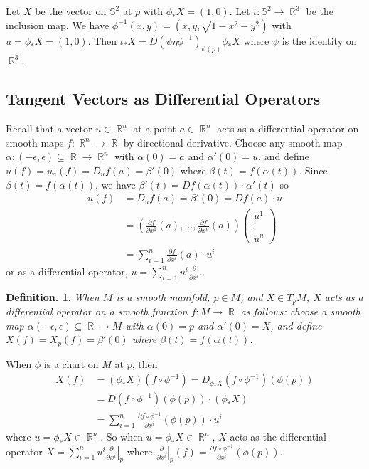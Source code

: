 \documentclass[11pt, a4paper]{memoir}
\DeclareMathOperator{\R}{{\mathbb{R}}}
\theoremstyle{change}
\theoremstyle{plain}
\theoremstyle{nonumberplain}
\newtheorem{definition}{Definition.}
\newcommand{\prt}[2]{\ensuremath{\frac{\partial #1}{\partial #2}}}
\numberwithin{equation}{section}
\begin{document}
Let $X$ be the vector on $\mathbb{S}^2$ at $p$ with $\phi_*X=(1,0)$.
Let $\iota:\mathbb{S}^2\to\R^3$ be the inclusion map.
We have $\phi^{-1}(x,y)=(x,y,\sqrt{1-x^2-y^2})$ with $u=\phi_*X=(1,0)$.
Then $\iota_*X=D(\psi\eta\phi^{-1})_{\phi(p)}\phi_*X$ where $\psi$ is the identity on $\R^3$.
\subsection{Tangent Vectors as Differential Operators}
Recall that a vector $u\in\R^n$ at a point $a\in\R^n$ acts as a differential operator on smooth maps $f:\R^n\to\R$ by directional derivative.
Choose any smooth map $\alpha:(-\epsilon,\epsilon)\subseteq\R\to\R^n$ with $\alpha(0)=a$ and $\alpha'(0)=u$, and define $u(f)=u_a(f)=D_uf(a)=\beta'(0)$ where $\beta(t)=f(\alpha(t))$.
Since $\beta(t)=f(\alpha(t))$, we have $\beta'(t)=Df(\alpha(t))\cdot\alpha'(t)$ so
\begin{align*}
    u(f) &= D_uf(a)=\beta'(0)=Df(a)\cdot u\\
         &= \left(\prt{f}{x^1}(a),\ldots,\prt{f}{x^n}(a)\right)\begin{pmatrix}u^1\\\vdots\\u^n\end{pmatrix}\\
         &=\sum_{i=1}^n\prt{f}{x^i}(a)\cdot u^i
\end{align*}
or as a differential operator, $u=\sum_{i=1}^n u^i\prt{}{x^i}$.
\begin{definition}
    When $M$ is a smooth manifold, $p\in M$, and $X\in T_pM$, $X$ acts as a differential operator on a smooth function $f:M\to\R$ as follows: choose a smooth map $\alpha(-\epsilon,\epsilon)\subseteq\R\to M$ with $\alpha(0)=p$ and $\alpha'(0)=X$, and define $X(f)=X_p(f)=\beta'(0)$ where $\beta(t)=f(\alpha(t))$.
\end{definition}
When $\phi$ is a chart on $M$ at $p$, then
\begin{align*}
    X(f) &= (\phi_*X)(f\circ\phi^{-1})=D_{\phi_*X}(f\circ\phi^{-1})(\phi(p))\\
         &= D(f\circ\phi^{-1})(\phi(p))\cdot(\phi_*X)\\
         &= \sum_{i=1}^n \prt{f\circ\phi^{-1}}{x^i}(\phi(p))\cdot u^i
\end{align*}
where $u=\phi_*X\in\R^n$.
So when $u=\phi_*X\in\R^n$, $X$ acts as the differential operator $X=\sum_{i=1}^n u^i\left.\prt{}{x^i}\right\rvert_p$ where $\left.\prt{}{x^i}\right\rvert_p(f)=\prt{f\circ\phi^{-1}}{x^i}(\phi(p))$.
\end{document}
